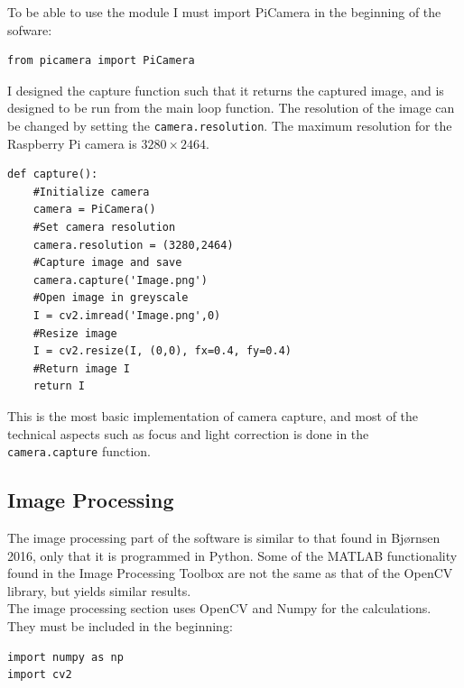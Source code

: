 To be able to use the module I must import PiCamera in the beginning of the sofware:

\begin{verbatim}
from picamera import PiCamera
\end{verbatim}
I designed the capture function such that it returns the captured image, and is designed to be run from the main loop function. The resolution of the image can be changed by setting the \texttt{camera.resolution}. The maximum resolution for the Raspberry Pi camera is $3280\times2464$.

\begin{verbatim}
def capture():
    #Initialize camera
    camera = PiCamera()
    #Set camera resolution
    camera.resolution = (3280,2464)
    #Capture image and save
    camera.capture('Image.png')
    #Open image in greyscale
    I = cv2.imread('Image.png',0)
    #Resize image
    I = cv2.resize(I, (0,0), fx=0.4, fy=0.4)
    #Return image I
    return I
\end{verbatim}
This is the most basic implementation of camera capture, and most of the technical aspects such as focus and light correction is done in the \texttt{camera.capture} function.


\subsection{Image Processing}
The image processing part of the software is similar to that found in Bjørnsen 2016\cite{kris}, only that it is programmed in Python. Some of the MATLAB functionality found in the Image Processing Toolbox are not the same as that of the OpenCV library, but yields similar results. \\

The image processing section uses OpenCV and Numpy for the calculations. They must be included in the beginning:

\begin{verbatim}
import numpy as np
import cv2
\end{verbatim}

